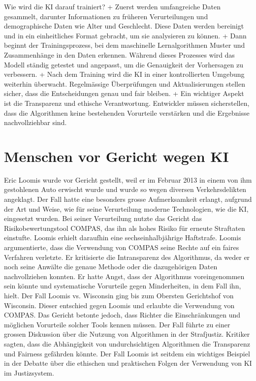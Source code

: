 \documentclass{article}
\begin{document}
Wie wird die KI darauf trainiert? \newline + Zuerst werden umfangreiche Daten gesammelt, darunter Informationen zu früheren Verurteilungen und
demographische Daten wie Alter und Geschlecht. Diese Daten werden bereinigt und in ein einheitliches 
Format gebracht, um sie analysieren zu können. \newline + Dann beginnt der Trainingsprozess, bei dem maschinelle Lernalgorithmen Muster und Zusammenhänge in den 
Daten erkennen. Während dieses Prozesses wird das Modell ständig getestet und angepasst, um die 
Genauigkeit der Vorhersagen zu verbessern. \newline + Nach dem Training wird die KI in einer kontrollierten Umgebung weiterhin überwacht. Regelmässige 
Überprüfungen und Aktualisierungen stellen sicher, dass die Entscheidungen genau und fair bleiben. \newline + Ein wichtiger Aspekt ist die Transparenz und ethische Verantwortung. Entwickler müssen sicherstellen, 
dass die Algorithmen keine bestehenden Vorurteile verstärken und die Ergebnisse nachvollziehbar sind. 



\section {Menschen vor Gericht wegen KI}

Eric Loomis wurde vor Gericht gestellt, weil er im Februar 2013 in einem von ihm gestohlenen Auto 
erwischt wurde und wurde so wegen diversen Verkehrsdelikten angeklagt. Der Fall hatte eine besonders grosse 
Aufmerksamkeit erlangt, aufgrund der Art und Weise, wie für seine Verurteilung moderne
Technologien, wie die KI, eingesetzt wurden.  
Bei seiner Verurteilung nutzte das Gericht das Risikobewertungstool COMPAS, das ihn als hohes Risiko für erneute 
Straftaten einstufte. Loomis erhielt daraufhin eine sechseinhalbjährige Haftstrafe.
Loomis argumentierte, dass die Verwendung von COMPAS seine Rechte auf ein faires Verfahren verletzte. Er kritisierte 
die Intransparenz des Algorithmus, da weder er noch seine Anwälte die genaue Methode oder die dazugehörigen Daten 
nachvollziehen konnten. Er hatte Angst, dass der Algorithmus voreingenommen sein könnte und systematische Vorurteile 
gegen Minderheiten, in dem Fall ihn, hielt.
Der Fall Loomis vs. Wisconsin ging bis zum Obersten Gerichtshof von Wisconsin. Dieser entschied gegen Loomis und 
erlaubte die Verwendung von COMPAS. Das Gericht betonte jedoch, dass Richter die Einschränkungen und möglichen Vorurteile 
solcher Tools kennen müssen.
Der Fall führte zu einer grossen Diskussion über die Nutzung von Algorithmen in der Strafjustiz. Kritiker sagten, 
dass die Abhängigkeit von undurchsichtigen Algorithmen die Transparenz und Fairness gefährden könnte. Der Fall Loomis 
ist seitdem ein wichtiges Beispiel in der Debatte über die ethischen und praktischen Folgen der Verwendung 
von KI im Justizsystem.  
\end{document}
